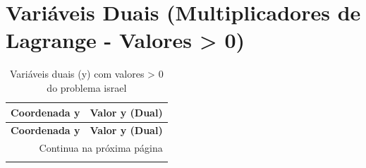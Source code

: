 \documentclass[12pt]{article}
\begin{document}
\begin{longtable}{@{}cccc@{}}
\bottomrule
\end{longtable}


\section{Variáveis Duais (Multiplicadores de Lagrange - Valores > 0)}

\begin{longtable}{@{}cc@{}}
\caption{Variáveis duais (y) com valores > 0 do problema israel} \\
\toprule
\textbf{Coordenada y} & \textbf{Valor y (Dual)} \\
\midrule
\endfirsthead

\toprule
\textbf{Coordenada y} & \textbf{Valor y (Dual)} \\
\midrule
\endhead

\midrule \multicolumn{2}{r}{{Continua na próxima página}} \\ \midrule
\endfoot

\bottomrule
\endlastfoot

\bottomrule
\end{longtable}
\end{document}
